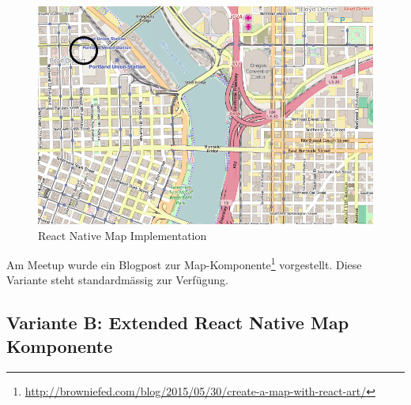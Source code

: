 \begin{figure}[H]
	\centering
	\includegraphics[width=\textwidth]{images/technischer_bericht/react-native_mapview.png}
	\caption{React Native Map Implementation}
	\label{image-variante-a-map}
\end{figure}

Am  Meetup wurde ein Blogpost zur  Map-Komponente\footnote{\url{http://browniefed.com/blog/2015/05/30/create-a-map-with-react-art/}} vorgestellt. Diese Variante steht standardmässig zur Verfügung.

\subsection{Variante B: Extended React Native Map Komponente}

